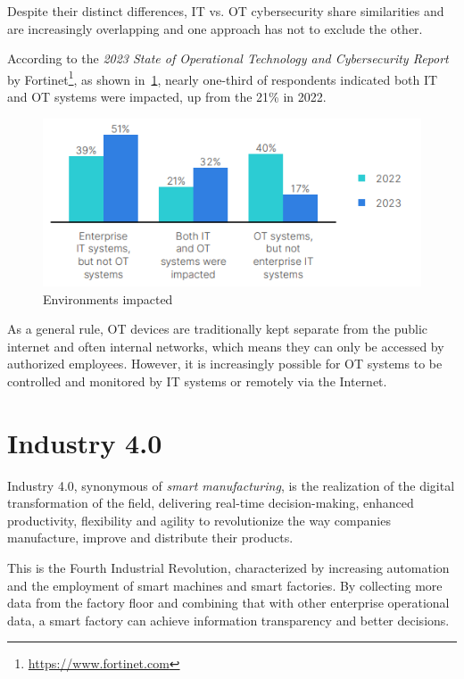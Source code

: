 Despite their distinct differences, IT vs. OT cybersecurity share similarities and are increasingly overlapping and one approach has not to exclude the other.

According to the \textit{2023 State of Operational Technology and Cybersecurity Report} by Fortinet\footnote{\url{https://www.fortinet.com}}, as shown in~\cref{fig:fortinet-intrusions-env-impacted}, nearly one-third of respondents indicated both IT and OT systems were impacted, up from the 21\% in 2022.

\begin{figure}[ht]
  \centering
  \includegraphics[scale=0.8]{chapters/02/assets/fortinet-intrusions-env-impacted.png}
  \caption[Environments impacted]{Environments impacted}
  \label{fig:fortinet-intrusions-env-impacted}
\end{figure}


As a general rule, OT devices are traditionally kept separate from the public internet and often internal networks, which means they can only be accessed by authorized employees. However, it is increasingly possible for OT systems to be controlled and monitored by IT systems or remotely via the Internet.~\cite{it-ot-cybersecurity}

\section{Industry 4.0}

Industry 4.0, synonymous of \textit{smart manufacturing}, is the realization of the digital transformation of the field, delivering real-time decision-making, enhanced productivity, flexibility and agility to revolutionize the way companies manufacture, improve and distribute their products.

This is the Fourth Industrial Revolution, characterized by increasing automation and the employment of smart machines and smart factories. By collecting more data from the factory floor and combining that with other enterprise operational data, a smart factory can achieve information transparency and better decisions.

